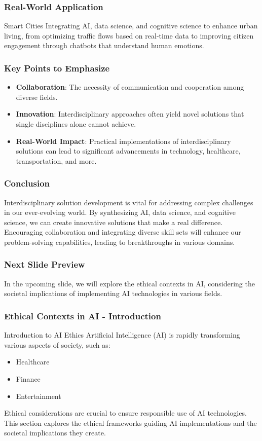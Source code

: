 \documentclass[aspectratio=169]{beamer}
\begin{document}
\begin{frame}[fragile]
    \frametitle{Real-World Application}
    \begin{block}{Smart Cities}
        Integrating AI, data science, and cognitive science to enhance urban living, from optimizing traffic flows based on real-time data to improving citizen engagement through chatbots that understand human emotions.
    \end{block}
\end{frame}

\begin{frame}[fragile]
    \frametitle{Key Points to Emphasize}
    \begin{itemize}
        \item \textbf{Collaboration}: The necessity of communication and cooperation among diverse fields.
        \item \textbf{Innovation}: Interdisciplinary approaches often yield novel solutions that single disciplines alone cannot achieve.
        \item \textbf{Real-World Impact}: Practical implementations of interdisciplinary solutions can lead to significant advancements in technology, healthcare, transportation, and more.
    \end{itemize}
\end{frame}

\begin{frame}[fragile]
    \frametitle{Conclusion}
    Interdisciplinary solution development is vital for addressing complex challenges in our ever-evolving world. By synthesizing AI, data science, and cognitive science, we can create innovative solutions that make a real difference. Encouraging collaboration and integrating diverse skill sets will enhance our problem-solving capabilities, leading to breakthroughs in various domains.
\end{frame}

\begin{frame}[fragile]
    \frametitle{Next Slide Preview}
    In the upcoming slide, we will explore the ethical contexts in AI, considering the societal implications of implementing AI technologies in various fields.
\end{frame}

\begin{frame}[fragile]
    \frametitle{Ethical Contexts in AI - Introduction}
    \begin{block}{Introduction to AI Ethics}
        Artificial Intelligence (AI) is rapidly transforming various aspects of society, such as:
        \begin{itemize}
            \item Healthcare
            \item Finance
            \item Entertainment
        \end{itemize}
        Ethical considerations are crucial to ensure responsible use of AI technologies. This section explores the ethical frameworks guiding AI implementations and the societal implications they create.
    \end{block}
\end{frame}
\end{document}
